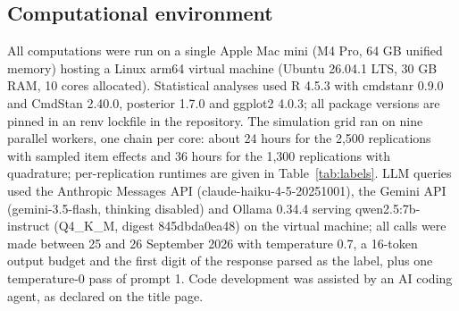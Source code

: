 \subsection{Computational environment}\label{sec:environment}
All computations were run on a single Apple Mac mini (M4 Pro, 64 GB unified memory) hosting a
Linux arm64 virtual machine (Ubuntu 26.04.1 LTS, 30 GB RAM, 10 cores allocated).
Statistical analyses used R 4.5.3 with cmdstanr 0.9.0 and CmdStan 2.40.0, posterior 1.7.0 and
ggplot2 4.0.3; all package versions are pinned in an renv lockfile in the repository. The
simulation grid ran on nine parallel workers, one chain per core: about 24 hours for the 2,500
replications with sampled item effects and 36 hours for the 1,300 replications with quadrature;
per-replication runtimes are given in Table~\ref{tab:labels}. LLM queries used the Anthropic
Messages API (claude-haiku-4-5-20251001), the Gemini API (gemini-3.5-flash, thinking disabled) and
Ollama 0.34.4 serving qwen2.5:7b-instruct (Q4\_K\_M, digest 845dbda0ea48) on the virtual machine;
all calls were made between 25 and 26 September 2026 with temperature 0.7, a 16-token output
budget and the first digit of the response parsed as the label, plus one temperature-0 pass of
prompt 1. Code development was assisted by an AI coding agent, as declared on the title page.
